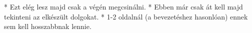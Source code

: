 
* Ezt elég lesz majd csak a végén megcsinálni.
* Ebben már csak át kell majd tekinteni az elkészült dolgokat.
* 1-2 oldalnál (a bevezetéshez hasonlóan) ennek sem kell hosszabbnak lennie.
